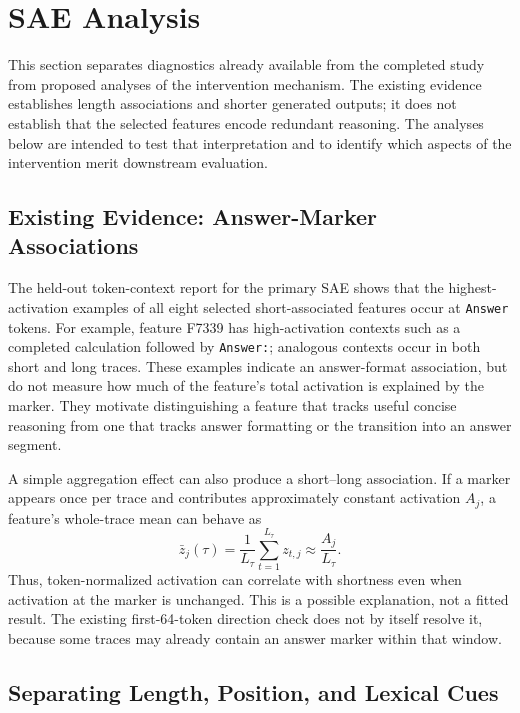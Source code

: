 \section{SAE Analysis}
\label{sec:sae_analysis}

This section separates diagnostics already available from the completed study from proposed analyses of the intervention mechanism.
The existing evidence establishes length associations and shorter generated outputs; it does not establish that the selected features encode redundant reasoning.
The analyses below are intended to test that interpretation and to identify which aspects of the intervention merit downstream evaluation.

\subsection{Existing Evidence: Answer-Marker Associations}
\label{sec:answer_marker_evidence}

The held-out token-context report for the primary SAE shows that the highest-activation examples of all eight selected short-associated features occur at \texttt{Answer} tokens.
For example, feature F7339 has high-activation contexts such as a completed calculation followed by \texttt{Answer:}; analogous contexts occur in both short and long traces.
These examples indicate an answer-format association, but do not measure how much of the feature's total activation is explained by the marker.
They motivate distinguishing a feature that tracks useful concise reasoning from one that tracks answer formatting or the transition into an answer segment.

A simple aggregation effect can also produce a short--long association.
If a marker appears once per trace and contributes approximately constant activation $A_j$, a feature's whole-trace mean can behave as
\begin{equation}
  \bar z_j(\tau)=\frac{1}{L_\tau}\sum_{t=1}^{L_\tau} z_{t,j}
  \approx \frac{A_j}{L_\tau}.
\label{eq:length_denominator}
\end{equation}
Thus, token-normalized activation can correlate with shortness even when activation at the marker is unchanged.
This is a possible explanation, not a fitted result.
The existing first-64-token direction check does not by itself resolve it, because some traces may already contain an answer marker within that window.

\subsection{Separating Length, Position, and Lexical Cues}
\label{sec:sae_falsification}

